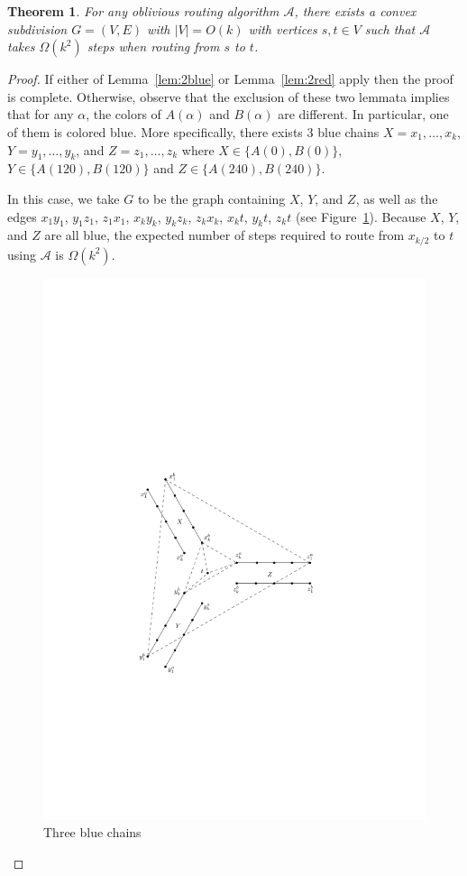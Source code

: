 \documentclass [letterpaper] {patmorin}
\newtheorem{theorem}{Theorem}%
\begin{document}
\begin{theorem}
  \label{thm:quadratic}
  For any
  oblivious routing algorithm $\mathcal{A}$,
  there exists a convex subdivision $G=(V,E)$ with $|V|=O(k)$ with vertices $s,t\in V$ such that $\mathcal{A}$ takes $\Omega(k^2)$ steps when routing from $s$ to $t$.
\end{theorem}

\begin{proof}

If either of Lemma~\ref{lem:2blue} or Lemma~\ref{lem:2red} apply then the proof
is complete.  Otherwise, observe that the exclusion of these two lemmata implies that for any $\alpha$, the colors of $A(\alpha)$ and $B(\alpha)$ are different.
In particular, one of them is colored blue.  More specifically, there exists 3 blue chains $X=x_1,\ldots,x_k$, $Y=y_1,\ldots,y_k$, and $Z=z_1,\ldots,z_k$ where $X\in\{A(0),B(0)\}$, $Y\in\{A(120),B(120)\}$ and $Z\in\{A(240),B(240)\}$.

In this case, we take $G$ to be the graph containing $X$, $Y$, and $Z$,
as well as the edges $x_1y_1$, $y_1z_1$, $z_1x_1$, $x_ky_k$, $y_kz_k$,
$z_kx_k$, $x_kt$, $y_kt$, $z_kt$ (see Figure~\ref{fig:3blue}).  Because
$X$, $Y$, and $Z$ are all blue, the expected number of steps required
to route from $x_{k/2}$ to $t$ using $\mathcal{A}$ is $\Omega(k^2)$.

\begin{figure}[ht]
  \centering
  \includegraphics{pics/3blue.pdf}
  \caption{Three blue chains}
  \label{fig:3blue}
\end{figure}


\end{proof}
\end{document}
